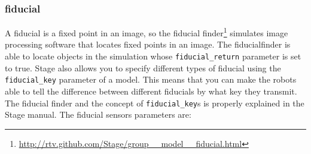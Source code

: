 \documentclass[a4paper]{report}
\begin{document}
\subsubsection{fiducial} 
A fiducial is a fixed point in an image, so the fiducial finder\footnote{\url{http://rtv.github.com/Stage/group__model__fiducial.html}} 
simulates image processing software that locates fixed points in an image. The fiducialfinder is able to locate objects in the simulation whose \verb|fiducial_return| parameter is set to true. Stage also allows you to specify different types of fiducial using the \verb|fiducial_key| parameter of a model. This means that you can make the robots able to tell the difference between different fiducials by what key they transmit. The fiducial finder and the concept of \verb|fiducial_key|s is properly explained in the Stage manual. The fiducial sensors parameters are:
\end{document}
